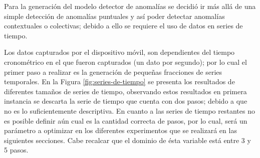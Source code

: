 Para la generaci\'{o}n del modelo detector de anomal\'{i}as se decidi\'{o} ir m\'{a}s all\'{a} de una simple detecci\'{o}n de anomal\'{i}as puntuales y as\'{i} poder detectar anomal\'{i}as contextuales o colectivas; debido a ello se requiere el uso de datos en series de tiempo.

\vspace{5mm} %

Los datos capturados por el dispositivo m\'{o}vil, son dependientes del tiempo cronom\'{e}trico en el que fueron capturados (un dato por segundo); por lo cual el primer paso a realizar es la generaci\'{o}n de peque\~{n}as fracciones de series temporales. En la Figura \ref{fig:series-de-tiempo} se presenta los resultados de diferentes tama\~{n}os de series de tiempo, observando estos resultados en primera instancia se descarta la serie de tiempo que cuenta con dos pasos; debido a que no es lo suficientemente descriptiva. En cuanto a las series de tiempo restantes no es posible definir a\'{u}n cual es la cantidad correcta de pasos, por lo cual, ser\'{a} un par\'{a}metro a optimizar en los diferentes experimentos que se realizar\'{a} en las siguientes secciones. Cabe recalcar que el dominio de \'{e}sta variable est\'{a} entre 3 y 5 pasos.

